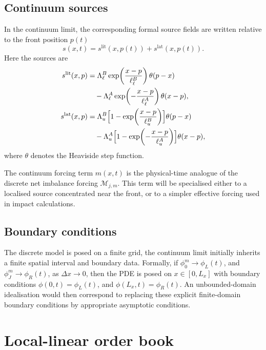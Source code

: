 \documentclass[5p,final]{elsarticle}
\begin{document}
\subsection{Continuum sources}

In the continuum limit, the corresponding formal source fields are written relative to the front position $p(t)$
\begin{equation}
    s(x,t)=s^{\mathrm{lit}}(x,p(t))+s^{\mathrm{lat}}(x,p(t)).
\end{equation}
Here the sources are
\begin{align}
    s^{\mathrm{lit}}(x,p)
    &=\Lambda_\ell^B\exp\!\left(\frac{x-p}{\ell_\ell^B}\right)\theta(p-x)
    \nonumber\\
    &\quad -
    \Lambda_\ell^A\exp\!\left(-\frac{x-p}{\ell_\ell^A}\right)\theta(x-p),
    \label{eq:stage3_lit_cont}
    \\
    s^{\mathrm{lat}}(x,p)
    &=
    \Lambda_u^B\Bigl[1-\exp\!\left(\frac{x-p}{\ell_u^B}\right)\Bigr]\theta(p-x) \nonumber\\
    &\quad -
    \Lambda_u^A\Bigl[1-\exp\!\left(-\frac{x-p}{\ell_u^A}\right)\Bigr]\theta(x-p),
    \label{eq:stage3_lat_cont}
\end{align}
where $\theta$ denotes the Heaviside step function.

The continuum forcing term $m(x,t)$ is the physical-time analogue of the discrete net imbalance forcing $\mathcal M_{j,m}$. This term will be specialised either to a localised source concentrated near the front, or to a simpler effective forcing used in impact calculations.

\subsection{Boundary conditions}

The discrete model is posed on a finite grid, the continuum limit initially inherits a finite spatial interval and boundary data. Formally, if $\phi_0^m\to \phi_L(t)$, and $\phi_J^m\to \phi_R(t)$, as $\Delta x\to0$, then the PDE is posed on $x\in[0,L_x]$ with boundary conditions
$\phi(0,t)=\phi_L(t)$, and $\phi(L_x,t)=\phi_R(t)$. An unbounded-domain idealisation would then correspond to replacing these explicit finite-domain boundary conditions by appropriate asymptotic conditions.

\section{Local-linear order book} \label{sec:locallinear}
\end{document}
